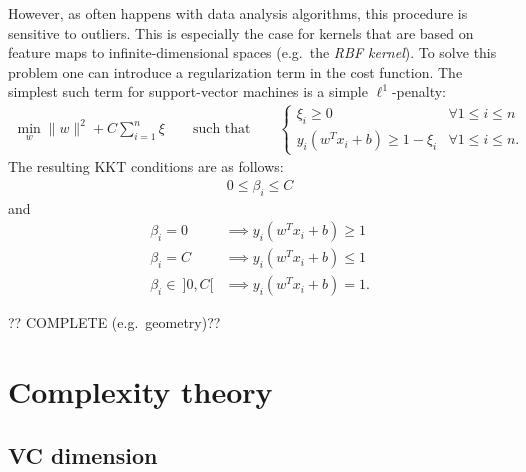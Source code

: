     However, as often happens with data analysis algorithms, this procedure is sensitive to outliers. This is especially the case for kernels that are based on feature maps to infinite-dimensional spaces (e.g.~the \textit{RBF kernel}). To solve this problem one can introduce a regularization term in the cost function. The simplest such term for support-vector machines is a simple $\ell^1$-penalty:
    \begin{gather}
        \min_w\|w\|^2 + C\sum_{i=1}^n\xi \qquad\text{such that}\qquad
        \begin{cases}
            \xi_i\geq0&\forall 1\leq i\leq n\\
            y_i(w^Tx_i+b)\geq1-\xi_i&\forall 1\leq i\leq n.
        \end{cases}
    \end{gather}
    The resulting KKT conditions are as follows:
    \begin{gather}
        0\leq\beta_i\leq C
    \end{gather}
    and
    \begin{align}
        \beta_i = 0&\implies y_i(w^Tx_i+b)\geq1\\
        \beta_i = C&\implies y_i(w^Tx_i+b)\leq1\\
        \beta_i\in\ ]0,C[&\implies y_i(w^Tx_i+b)=1.
    \end{align}

    ?? COMPLETE (e.g.~geometry)??

\section{Complexity theory}
\subsection{VC dimension}

